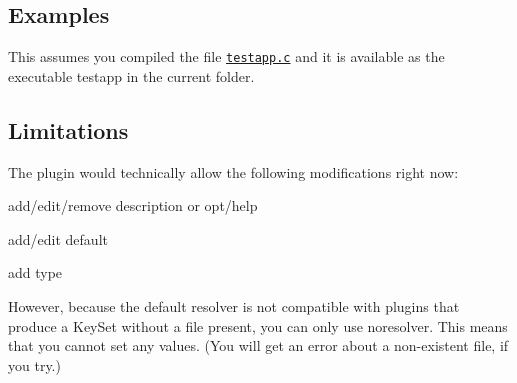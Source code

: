 \subsection*{Examples}

This assumes you compiled the file \href{/home/markus/Projekte/Elektra/current/src/plugins/specload/testapp.c}{\tt {\ttfamily testapp.\+c}} and it is available as the executable {\ttfamily testapp} in the current folder.




\subsection*{Limitations}


\begin{DoxyItemize}
\item The plugin would technically allow the following modifications right now\+:
\begin{DoxyItemize}
\item add/edit/remove {\ttfamily description} or {\ttfamily opt/help}
\item add/edit {\ttfamily default}
\item add {\ttfamily type}
\end{DoxyItemize}

However, because the default {\ttfamily resolver} is not compatible with plugins that produce a Key\+Set without a file present, you can only use {\ttfamily noresolver}. This means that you cannot set any values. (You will get an error about a non-\/existent file, if you try.) 
\end{DoxyItemize}